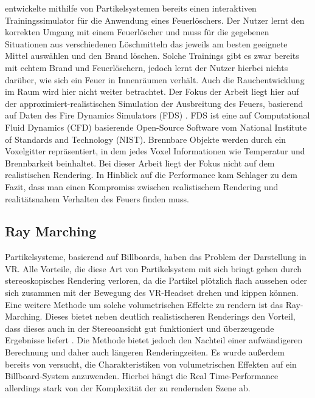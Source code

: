 \parencite{Schlager2017} entwickelte mithilfe von Partikelsystemen bereits einen interaktiven Trainingssimulator für die Anwendung 
eines Feuerlöschers. Der Nutzer lernt den korrekten Umgang mit einem Feuerlöscher und muss für die gegebenen Situationen 
aus verschiedenen Löschmitteln das jeweils am besten geeignete Mittel auswählen und den Brand löschen. Solche Trainings 
gibt es zwar bereits mit echtem Brand und Feuerlöschern, jedoch lernt der Nutzer hierbei nichts darüber, wie sich ein Feuer in 
Innenräumen verhält. Auch die Rauchentwicklung im Raum wird hier nicht weiter betrachtet. Der Fokus der Arbeit liegt hier auf der 
approximiert-realistischen Simulation der Ausbreitung des Feuers, basierend auf Daten des Fire Dynamics Simulators (FDS) \parencite{FDS2004}. 
FDS ist eine auf Computational Fluid Dynamics (CFD) basierende Open-Source Software vom National Institute of Standards and Technology (NIST).
Brennbare Objekte werden durch ein Voxelgitter repräsentiert, in dem jedes Voxel Informationen wie Temperatur und Brennbarkeit beinhaltet.
Bei dieser Arbeit liegt der Fokus nicht auf dem realistischen Rendering. 
In Hinblick auf die Performance kam Schlager zu dem Fazit, dass man einen Kompromiss zwischen realistischem Rendering 
und realitätsnahem Verhalten des Feuers finden muss.



\subsection{Ray Marching}
Partikelsysteme, basierend auf Billboards, haben das Problem der Darstellung in VR. Alle Vorteile, die diese Art von 
Partikelsystem mit sich bringt gehen durch stereoskopisches Rendering verloren, da die Partikel plötzlich flach aussehen 
oder sich zusammen mit der Bewegung des VR-Headset drehen und kippen können. Eine weitere Methode um solche volumetrischen 
Effekte zu rendern ist das Ray-Marching. Dieses bietet neben deutlich realistischeren Renderings den Vorteil, dass dieses 
auch in der Stereoansicht gut funktioniert und überzeugende Ergebnisse liefert \parencite{Wald2006}. Die Methode bietet 
jedoch den Nachteil einer aufwändigeren Berechnung und daher auch längeren Renderingzeiten. Es wurde außerdem bereits von 
\parencite{Zhang2020} versucht, die Charakteristiken von volumetrischen Effekten auf ein Billboard-System anzuwenden. 
Hierbei hängt die Real Time-Performance allerdings stark von der Komplexität der zu rendernden Szene ab.